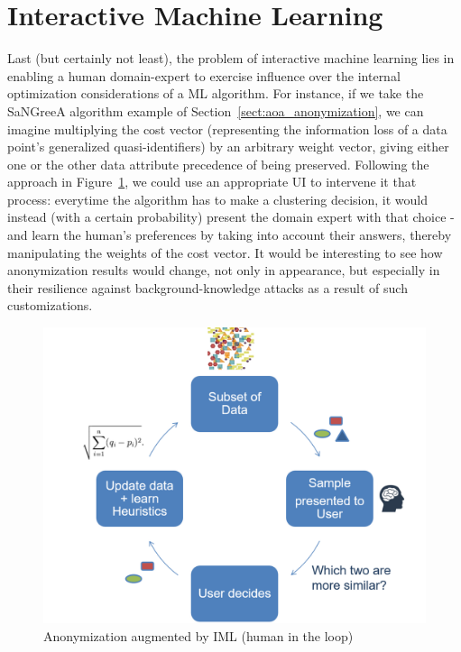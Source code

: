 \section{Interactive Machine Learning}
\label{sect:fut_iml}

Last (but certainly not least), the problem of interactive machine learning lies in enabling a human domain-expert to exercise influence over the internal optimization considerations of a ML algorithm. For instance, if we take the SaNGreeA algorithm example of Section~\ref{sect:aoa_anonymization}, we can imagine multiplying the cost vector (representing the information loss of a data point's generalized quasi-identifiers) by an arbitrary weight vector, giving either one or the other data attribute precedence of being preserved. Following the approach in Figure~\ref{fig:anonIML}, we could use an appropriate UI to intervene it that process: everytime the algorithm has to make a clustering decision, it would instead (with a certain probability) present the domain expert with that choice - and learn the human's preferences by taking into account their answers, thereby manipulating the weights of the cost vector. It would be interesting to see how anonymization results would change, not only in appearance, but especially in their resilience against background-knowledge attacks as a result of such customizations.

\vspace{0.3cm}
\begin{figure}[ht]
	\begin{center}
		\includegraphics[width=1\textwidth]{figures/anonym/anonIML}
		\caption{Anonymization augmented by IML (human in the loop)}
		\label{fig:anonIML}
	\end{center}
\end{figure}
